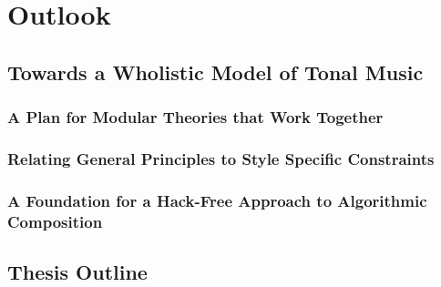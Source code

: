 \chapter{Outlook}
    \section{Towards a Wholistic Model of Tonal Music}
        \subsection{A Plan for Modular Theories that Work Together}
        \subsection{Relating General Principles to Style Specific Constraints}
        \subsection{A Foundation for a Hack-Free Approach to Algorithmic Composition}
    \section{Thesis Outline}